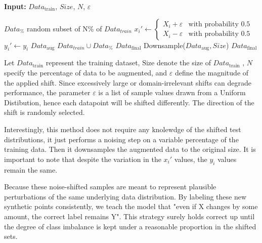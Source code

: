 \begin{algorithm}[H]
    \vspace{0.6em}
    \textbf{Input:} $Data_{\text{train}}$, $Size$, $N$, $\varepsilon$
    \vspace{0.6em}
    \begin{algorithmic}[1]
        \State $Data_{\%}$ \leftarrow random subset of N\% of $Data_{train}$
            \vspace{0.6em}
            \State $x_i' \leftarrow 
            \begin{cases}
                X_i + \varepsilon & \text{with probability } 0.5 \\
                X_i - \varepsilon & \text{with probability } 0.5
            \end{cases}$
            \State $y_i' \leftarrow y_i$
            \vspace{0.6em}
        \EndFor
        \vspace{0.6em}
        \State $Data_\text{aug}$ \leftarrow $Data_{train} \cup Data_{\%}$
        \State $Data_\text{final}$ \leftarrow Downsample($Data_\text{aug}, Size$)
        \vspace{0.6em}
        \State \Return $Data_{\text{final}}$
    \end{algorithmic}
    \caption{Let $Data_{\text{train}}$ represent the training dataset, $\text{Size}$ denote the size of $Data_{\text{train}}$ , $N$ specify the percentage of data to be augmented, and $\varepsilon$ define the magnitude of the applied shift. Since excessively large or domain-irrelevant shifts can degrade performance, the parameter $\varepsilon$ is a list of sample values drawn from a Uniform Distibution, hence each datapoint will be shifted differently. The direction of the shift is randomly selected.}
\end{algorithm}



Interestingly, this method does not require any knolewdge of the shifted test distributions, it just performs a noising step on a variable percentage of the training data. Then it downsamples the augmented data to the original size.
It is important to note that despite the variation in the $x_i'$ values, the $y_i$ values remain the same.

\begin{tcolorbox}[colback=gray!5,colframe=gray!40,title= Why Keep the Same Label?]
    Because these noise-shifted samples are meant to represent plausible perturbations of the same underlying data distribution. By labeling these new synthetic points consistently, we teach the model that "even if X changes by some amount, the correct label remains Y". This strategy surely holds correct up until the degree of class imbalance is kept under a reasonable proportion in the shifted sets.
\end{tcolorbox}





